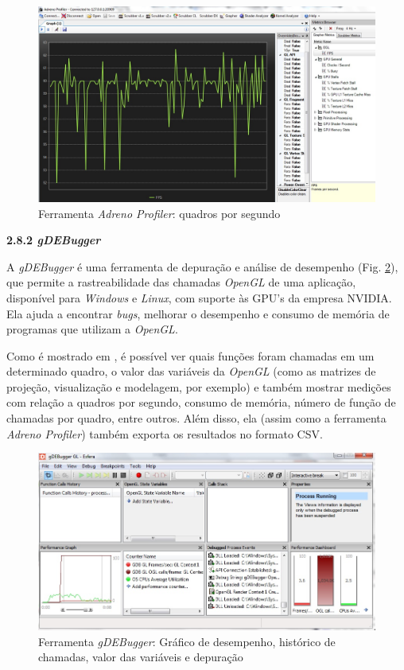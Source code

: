 \begin{description}
	\begin{figure}[h]
	\centering
		\includegraphics[keepaspectratio=true,scale=0.35]{figuras/graph.jpg}
	\caption{Ferramenta \textit{Adreno Profiler}: quadros por segundo}
	\label{graph}
	\end{figure}


	\item \textbf{2.8.2 \textit{gDEBugger}}
	
	A \textit{gDEBugger} é uma ferramenta de depuração e análise de desempenho (Fig. \ref{gdebugger_fer}), que permite a rastreabilidade das chamadas \textit{OpenGL} de uma aplicação, disponível para \textit{Windows} e \textit{Linux}, com suporte às GPU's da empresa NVIDIA. Ela ajuda a encontrar  \textit{bugs}, melhorar o desempenho e consumo de memória de programas que utilizam a \textit{OpenGL}. 

	Como é mostrado em \cite{gdebugger}, é possível ver quais funções foram chamadas em um determinado quadro, o valor das variáveis da \textit{OpenGL} (como as matrizes de projeção, visualização e modelagem, por exemplo) e também mostrar medições com relação a quadros por segundo, consumo de memória, número de função de chamadas por quadro, entre outros. Além disso, ela (assim como a ferramenta \textit{Adreno Profiler}) também exporta os resultados no formato CSV.  

	\begin{figure}[h]
	\centering
		\includegraphics[keepaspectratio=true,scale=0.7]{figuras/gdebugger_fer.jpg}
	\caption{Ferramenta \textit{gDEBugger}: Gráfico de desempenho, histórico de chamadas, valor das variáveis e depuração}
	\label{gdebugger_fer}
	\end{figure}

\end{description} 

